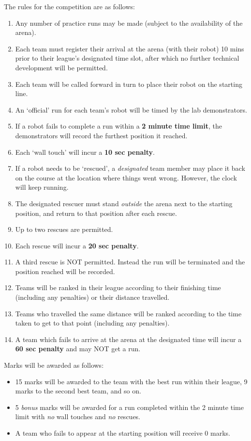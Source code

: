 \documentclass[hidelinks,a4paper,11pt]{article}
\begin{document}
	The rules for the competition are as follows:
	\begin{enumerate}
		\item Any number of practice runs may be made (subject to the availability of the arena).
		\item Each team must register their arrival at the arena (with their robot) 10 mins prior to their league's designated time slot, after which no further technical development will be permitted.
		\item Each team will be called forward in turn to place their robot on the starting line.
		\item An `official' run for each team's robot will be timed by the lab demonstrators.
		\item If a robot fails to complete a run within a \textbf{2 minute time limit}, the demonstrators will record the furthest position it reached.
		\item Each `wall touch' will incur a \textbf{10 sec penalty}.
		\item If a robot needs to be `rescued', a \emph{designated} team member may place it back on the course at the location where things went wrong.  However, the clock will keep running.
		\item The designated rescuer must stand \emph{outside} the arena next to the starting position, and return to that position after each rescue.
		\item Up to two rescues are permitted.
		\item Each rescue will incur a \textbf{20 sec penalty}.
		\item A third rescue is NOT permitted.  Instead the run will be terminated and the position reached will be recorded.
		\item Teams will be ranked in their league according to their finishing time (including any penalties) or their distance travelled.
		\item Teams who travelled the same distance will be ranked according to the time taken to get to that point (including any penalties).
		\item A team which fails to arrive at the arena at the designated time will incur a \textbf{60 sec penalty} and may NOT get a run.
	\end{enumerate}
	
	Marks will be awarded as follows:
	\begin{itemize}
		\item 15 marks will be awarded to the team with the best run within their league, 9 marks to the second best team, and so on.
		\item 5 \emph{bonus} marks will be awarded for a run completed within the 2 minute time limit with \emph{no} wall touches and \emph{no} rescues.
		\item A team who fails to appear at the starting position will receive 0 marks.
	\end{itemize}
	
\end{document}
